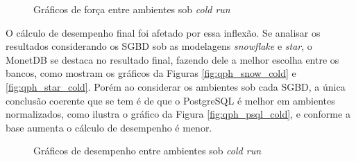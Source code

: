 \begin{figure}[htpb]
        \centering
        \caption{Gráficos de força entre ambientes sob \textit{cold run}}
        \label{fig:power_cold}
\end{figure}

O cálculo de desempenho final foi afetado por essa inflexão. Se analisar os resultados considerando os SGBD sob as modelagens \textit{snowflake} e \textit{star}, o MonetDB se destaca no resultado final, fazendo dele a melhor escolha entre os bancos, como mostram os gráficos da Figuras \ref{fig:qph_snow_cold} e \ref{fig:qph_star_cold}. Porém ao considerar os ambientes sob cada SGBD, a única conclusão coerente que se tem é de que o PostgreSQL é melhor em ambientes normalizados, como ilustra o gráfico da Figura \ref{fig:qph_psql_cold}, e conforme a base aumenta o cálculo de desempenho é menor.

\begin{figure}[htpb]
        \centering
        \caption{Gráficos de desempenho entre ambientes sob \textit{cold run}}
        \label{fig:qph_model_cold}
\end{figure}
    
